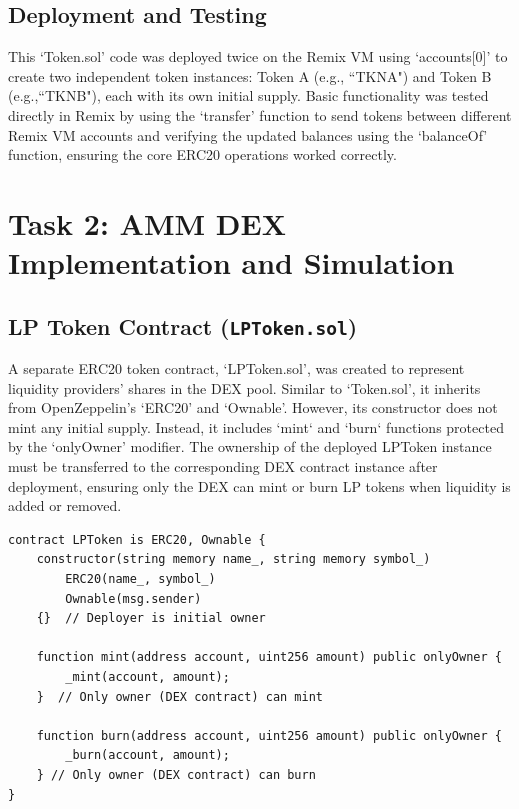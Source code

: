 \documentclass[12pt]{article}
\begin{document}
\subsection{Deployment and Testing}
This `Token.sol' code was deployed twice on the Remix VM using `accounts[0]' to create two independent token instances: Token A (e.g., ``TKNA") and Token B (e.g.,``TKNB"), each with its own initial supply. Basic functionality was tested directly in Remix by using the `transfer' function to send tokens between different Remix VM accounts and verifying the updated balances using the `balanceOf' function, ensuring the core ERC20 operations worked correctly.
\section{Task 2: AMM DEX Implementation and Simulation}

\subsection{LP Token Contract (\texttt{LPToken.sol})}
A separate ERC20 token contract, `LPToken.sol', was created to represent liquidity providers' shares in the DEX pool. Similar to `Token.sol', it inherits from OpenZeppelin's `ERC20' and `Ownable'. However, its constructor does not mint any initial supply. Instead, it includes `mint` and `burn` functions protected by the `onlyOwner' modifier. The ownership of the deployed LPToken instance must be transferred to the corresponding DEX contract instance after deployment, ensuring only the DEX can mint or burn LP tokens when liquidity is added or removed.

\begin{lstlisting}[language=Solidity, caption={LP Token Contract (`LPToken.sol`)}]
contract LPToken is ERC20, Ownable {
    constructor(string memory name_, string memory symbol_)
        ERC20(name_, symbol_)
        Ownable(msg.sender)
    {}  // Deployer is initial owner

    function mint(address account, uint256 amount) public onlyOwner {
        _mint(account, amount);
    }  // Only owner (DEX contract) can mint

    function burn(address account, uint256 amount) public onlyOwner {
        _burn(account, amount);
    } // Only owner (DEX contract) can burn
}
\end{lstlisting}
\end{document}
